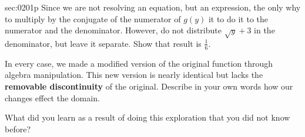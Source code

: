 \begin{multicols*}{2}
\begin{exercises}{sec:0201p}
\vspace{1cm}
\lab{} Since we are not resolving an equation, but an expression, the only why to multiply by the 
conjugate of the numerator of $g(y)$ it to do it to the numerator and the denominator.  However,
do not distribute $\sqrt{y}+3$ in the denominator, but leave it separate.  Show that result is
$\frac{1}{6}$.

\vspace{2cm}
\lab{}  In every case, we made a modified version of the original function through 
algebra manipulation.  This new version is nearly identical but lacks the 
\textbf{removable discontinuity} of the original. Describe in your own words how our 
changes effect the domain.

\vspace{3cm}
\lab{} What did you learn as a result of doing this exploration that you did not know before?

\end{exercises}
\end{multicols*}